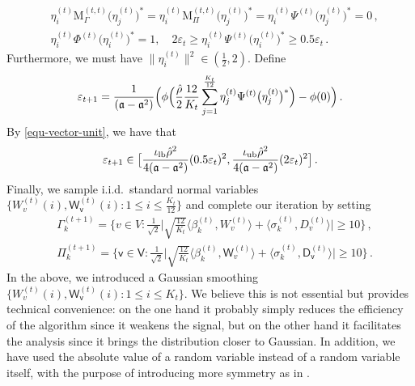 \documentclass[11pt]{article}
\numberwithin{equation}{section}
\begin{document}
\begin{align}
    & \eta^{(t)}_i \mathrm{M}_{\Gamma}^{(t,t)} \big(\eta^{(t)}_j \big)^{*}
    =\eta^{(t)}_i \mathrm{M}_{\Pi}^{(t,t)} \big( \eta^{(t)}_j \big)^{*}
    =\eta^{(t)}_i \Psi^{(t)} \big(\eta^{(t)}_j \big)^{*} =0 \,, \label{equ-vector-orthogonal} \\
    & \eta^{(t)}_i \Phi^{(t)} \big(\eta^{(t)}_i \big)^{*} =1, \quad  2 \varepsilon_t \geq   \eta^{(t)}_i \Psi^{(t)} \big(\eta^{(t)}_i \big)^{*} \geq 0.5 \varepsilon_t\,. \label{equ-vector-unit}
\end{align}
Furthermore, we must have $\| \eta^{(t)}_i \|^2 \in (\frac{1}{2},2)$. Define
\begin{align}
    \varepsilon_{t+1} = \frac{1}{ (\mathfrak{a} - \mathfrak{a}^2) } \Big( \phi \Big( \frac{\Hat{\rho}}{2} \frac{12}{K_t} \sum_{j=1}^{\frac{K_t}{12}} \eta^{(t)}_j \Psi^{(t)} \big( \eta^{(t)}_j \big)^{*} \Big) - \phi(0) \Big)  \,.
    \label{equ-def-iter-varepsilon}
\end{align}
By \eqref{equ-vector-unit}, we have that
\begin{equation}
    \label{equ-epsilon-t-bound}
    \varepsilon_{t+1} \in \big[ \frac{ \iota_{\mathrm{lb}} \Hat{\rho}^{2} } { 4(\mathfrak{a}-\mathfrak{a}^2) }  (0.5 \varepsilon_t)^2 , \frac{\iota_{\mathrm{ub}} \Hat{\rho}^{2}} { 4(\mathfrak{a}-\mathfrak{a}^2)}  (2 \varepsilon_t)^2 \big]\,.
\end{equation}
Finally, we sample i.i.d.\ standard normal variables $\{ W^{(t)}_v(i), \mathsf{W}^{(t)}_{\mathsf{v}}(i): 1 \leq i \leq \frac{K_t}{12} \}$ and complete our iteration by setting
\begin{equation}
    \begin{aligned}
        &\Gamma^{(t+1)}_k= \Big\{  v \in V : \frac{1}{\sqrt{2}}  \Big| \sqrt{\frac{12}{K_t}} \langle \beta^{(t)}_k, W^{(t)}_v \rangle + \langle \sigma^{(t)}_k,D^{(t)}_v \rangle \Big| \geq 10  \Big\}\,,  \\
        &\Pi^{(t+1)}_k= \Big\{  \mathsf{v} \in \mathsf{V} : \frac{1}{\sqrt{2}} \Big| \sqrt{\frac{12}{K_t}} \langle \beta^{(t)}_k, \mathsf{W}^{(t)}_v \rangle + \langle \sigma^{(t)}_k, \mathsf{D}^{(t)}_{\mathsf{v}} \rangle \Big| \geq 10 \Big\}\,.
        \label{equ-def-iter-sets}
    \end{aligned}
\end{equation}
In the above, we introduced a Gaussian smoothing $\{ W^{(t)}_v(i), \mathsf{W}^{(t)}_{\mathsf{v}}(i): 1 \leq i \leq K_t \}$. We believe this is not essential but provides technical convenience: on the one hand it probably simply reduces the efficiency of the algorithm since it weakens the signal, but on the other hand it facilitates the analysis since it brings the distribution closer to Gaussian. In addition, we have used the absolute value of a random variable instead of a random variable itself, with the purpose of introducing more symmetry as in \cite{DL22+}.
\end{document}
